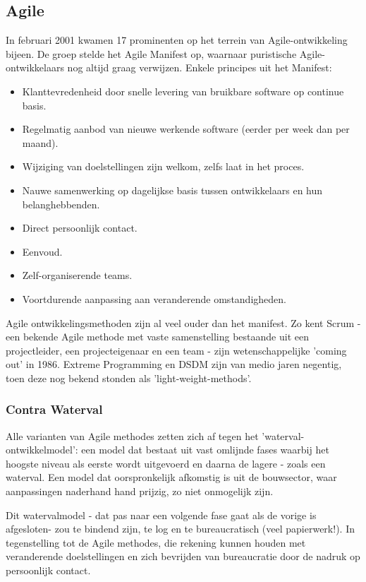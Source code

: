 \subsection{Agile}
In februari 2001 kwamen 17 prominenten op het terrein van Agile-ontwikkeling bijeen. De groep stelde het Agile Manifest \cite{Kent} op, waarnaar puristische Agile-ontwikkelaars nog altijd graag verwijzen. Enkele principes uit het Manifest: 
\begin{itemize}
	\item Klanttevredenheid door snelle levering van bruikbare software op continue basis.
	\item Regelmatig aanbod van nieuwe werkende software (eerder per week dan per maand).
	\item Wijziging van doelstellingen zijn welkom, zelfs laat in het proces.
	\item Nauwe samenwerking op dagelijkse basis tussen ontwikkelaars en hun belanghebbenden.
	\item Direct persoonlijk contact.
	\item Eenvoud.
	\item Zelf-organiserende teams.
	\item Voortdurende aanpassing aan veranderende omstandigheden.
\end{itemize}

Agile ontwikkelingsmethoden zijn al veel ouder dan het manifest. Zo kent Scrum - een bekende Agile methode met vaste samenstelling bestaande uit een projectleider, een projecteigenaar en een team - zijn wetenschappelijke 'coming out' in 1986. Extreme Programming en DSDM zijn van medio jaren negentig, toen deze nog bekend stonden als 'light-weight-methods'.

\subsubsection{Contra Waterval}
Alle varianten van Agile methodes zetten zich af tegen het 'waterval-ontwikkelmodel': een model dat bestaat uit vast omlijnde fases waarbij het hoogste niveau als eerste wordt uitgevoerd en daarna de lagere - zoals een waterval. Een model dat oorspronkelijk afkomstig is uit de bouwsector, waar aanpassingen naderhand hand prijzig, zo niet onmogelijk zijn.

Dit watervalmodel - dat pas naar een volgende fase gaat als de vorige is afgesloten- zou te bindend zijn, te log en te bureaucratisch (veel papierwerk!). In tegenstelling tot de Agile methodes, die rekening kunnen houden met veranderende doelstellingen en zich bevrijden van bureaucratie door de nadruk op persoonlijk contact.

